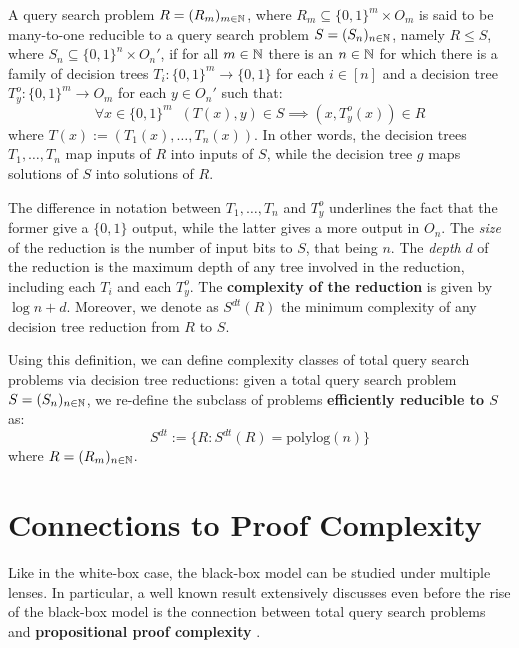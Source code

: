 \begin{definition}
    A query search problem $R = (R_m)_{m \in \mathbb{N}}$, where $R_m \subseteq \{0,1\}^m \times O_m$ is said to be many-to-one reducible to a query search problem $S = (S_n)_{n \in \mathbb{N}}$, namely $R \leq S$, where $S_n \subseteq \{0,1\}^n \times O_n'$, if for all $m \in \mathbb{N}$ there is an $n \in \mathbb{N}$ for which there is a family of decision trees $T_i : \{0,1\}^m \to \{0,1\}$ for each $i \in [n]$ and a decision tree $T_y^o : \{0,1\}^m \to O_m$ for each $y \in O_n'$ such that:
    \[\forall x \in \{0,1\}^m \;\; (T(x), y) \in S \implies (x, T_y^o(x)) \in R\]
    where $T(x) := (T_1(x), \ldots, T_n(x))$. In other words, the decision trees $T_1, \ldots, T_n$ map inputs of $R$ into inputs of $S$, while the decision tree $g$ maps solutions of $S$ into solutions of $R$. 
\end{definition}

The difference in notation between $T_1, \ldots, T_n$ and $T_y^o$ underlines the fact that the former give a $\{0,1\}$ output, while the latter gives a more output in $O_n$. The \textit{size} of the reduction is the number of input bits to $S$, that being $n$. The \textit{depth} $d$ of the reduction is the maximum depth of any tree involved in the reduction, including each $T_i$ and each $T_y^o$. The \textbf{complexity of the reduction} is given by $\log n + d$. Moreover, we denote as $S^{dt}(R)$ the minimum complexity of any decision tree reduction from $R$ to $S$.

\newpage

Using this definition, we can define complexity classes of total query search problems via decision tree reductions: given a total query search problem $S = (S_n)_{n \in \mathbb{N}}$, we re-define the subclass of problems \textbf{efficiently reducible to $S$} as:
\[S^{dt} := \{R : S^{dt}(R) = \mathrm{polylog}(n)\}\]
where $R = (R_m)_{n \in \mathbb{N}}$.

\section{Connections to Proof Complexity}

Like in the white-box case, the black-box \TFNP model can be studied under multiple lenses. In particular, a well known result extensively discusses even before the rise of the black-box model is the connection between total query search problems and \textbf{propositional proof complexity} \cite{tfnp_characterization, separations_proof_complexity,proofs_circuits_communication}.


